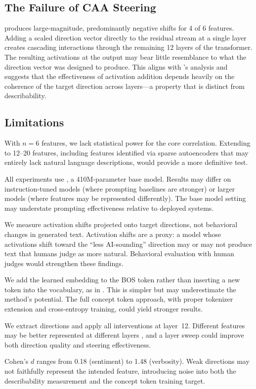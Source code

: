 \subsection{The Failure of CAA Steering}

\caa produces large-magnitude, predominantly negative shifts for 4 of 6 features. Adding a scaled direction vector directly to the residual stream at a single layer creates cascading interactions through the remaining 12 layers of the transformer. The resulting activations at the output may bear little resemblance to what the direction vector was designed to produce. This aligns with \citet{braun2025unreliability}'s analysis and suggests that the effectiveness of activation addition depends heavily on the coherence of the target direction across layers---a property that is distinct from describability.

\subsection{Limitations}
\label{sec:limitations}

With $n = 6$ features, we lack statistical power for the core correlation. Extending to 12--20 features, including features identified via sparse autoencoders that may entirely lack natural language descriptions, would provide a more definitive test.

All experiments use \pythia, a 410M-parameter base model. Results may differ on instruction-tuned models (where prompting baselines are stronger) or larger models (where features may be represented differently). The base model setting may understate prompting effectiveness relative to deployed systems.

We measure activation shifts projected onto target directions, not behavioral changes in generated text. Activation shifts are a proxy: a model whose activations shift toward the ``less AI-sounding'' direction may or may not produce text that humans judge as more natural. Behavioral evaluation with human judges would strengthen these findings.

We add the learned embedding to the BOS token rather than inserting a new token into the vocabulary, as in \citet{sastre2026concept}. This is simpler but may underestimate the method's potential. The full concept token approach, with proper tokenizer extension and cross-entropy training, could yield stronger results.

We extract directions and apply all interventions at layer~12. Different features may be better represented at different layers \cite{zou2023representation}, and a layer sweep could improve both direction quality and steering effectiveness.

Cohen's $d$ ranges from 0.18 (sentiment) to 1.48 (verbosity). Weak directions may not faithfully represent the intended feature, introducing noise into both the describability measurement and the concept token training target.
